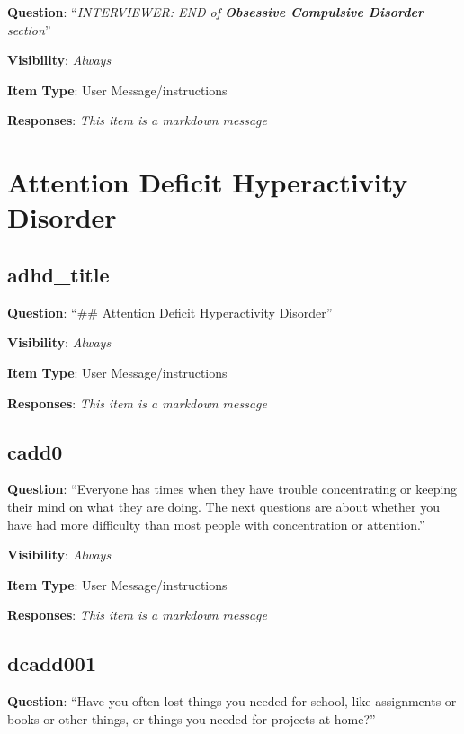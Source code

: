 \documentclass[]{book}
\begin{document}
\textbf{Question}: ``\emph{INTERVIEWER: END of \textbf{Obsessive Compulsive Disorder} section}''

\textbf{Visibility}: \emph{Always}

\textbf{Item Type}: User Message/instructions

\textbf{Responses}: \emph{This item is a markdown message}

\hypertarget{adhd_section}{%
\chapter{Attention Deficit Hyperactivity Disorder}\label{adhd_section}}

\hypertarget{adhd_title}{%
\section{adhd\_title}\label{adhd_title}}

\textbf{Question}: ``\#\# Attention Deficit Hyperactivity Disorder''

\textbf{Visibility}: \emph{Always}

\textbf{Item Type}: User Message/instructions

\textbf{Responses}: \emph{This item is a markdown message}

\hypertarget{cadd0}{%
\section{cadd0}\label{cadd0}}

\textbf{Question}: ``Everyone has times when they have trouble concentrating or keeping their mind on what they are doing. The next questions are about whether you have had more difficulty than most people with concentration or attention.''

\textbf{Visibility}: \emph{Always}

\textbf{Item Type}: User Message/instructions

\textbf{Responses}: \emph{This item is a markdown message}

\hypertarget{dcadd001}{%
\section{dcadd001}\label{dcadd001}}

\textbf{Question}: ``Have you often lost things you needed for school, like assignments or books or other things, or things you needed for projects at home?''
\end{document}
